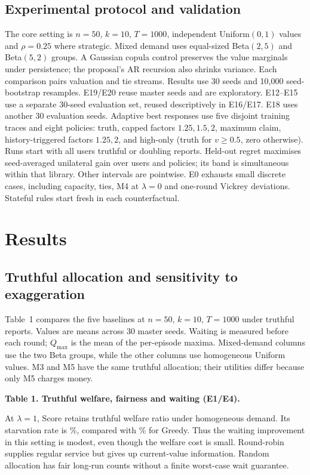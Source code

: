 \documentclass{article}
\newcommand{\resulttable}[1]{\begin{center}\small\setlength{\tabcolsep}{5pt}\end{center}}
\begin{document}
\subsection{Experimental protocol and validation}
The core setting is $n=50$, $k=10$, $T=1000$, independent Uniform$(0,1)$
values and $\rho=0.25$ where strategic. Mixed demand uses equal-sized
Beta$(2,5)$ and Beta$(5,2)$ groups. A Gaussian copula control preserves the
value marginals under persistence; the proposal's AR recursion also shrinks variance.
Each comparison pairs valuation and tie streams. Results use 30 seeds and
10,000 seed-bootstrap resamples. E19/E20 reuse master seeds and are exploratory.
E12--E15 use a separate 30-seed evaluation set, reused descriptively in E16/E17.
E18 uses another 30 evaluation seeds. Adaptive best responses use five disjoint
training traces and eight policies: truth, capped factors $1.25,1.5,2$,
maximum claim, history-triggered factors $1.25,2$, and high-only
(truth for $v\ge0.5$, zero otherwise). Runs start with all users truthful or
doubling reports.
Held-out regret maximises seed-averaged unilateral gain over users and policies;
its band is simultaneous within that library. Other intervals are pointwise.
E0 exhausts small discrete cases, including capacity, ties, M4 at $\lambda=0$
and one-round Vickrey deviations. Stateful rules start fresh in each counterfactual.



\newpage
\section{Results}
\subsection{Truthful allocation and sensitivity to exaggeration}
Table~1 compares the five baselines at $n=50$, $k=10$, $T=1000$ under
truthful reports. Values are means across 30 master seeds. Waiting is measured
before each round; $Q_{\max}$ is the mean of the per-episode maxima.
Mixed-demand columns use the two Beta groups, while the other columns use
homogeneous Uniform values. M3 and M5 have the same truthful allocation;
their utilities differ because only M5 charges money.

\begin{center}\small\textbf{Table 1. Truthful welfare, fairness and waiting (E1/E4).}\end{center}
\resulttable{truth}

At $\lambda=1$, Score retains truthful welfare ratio \TruthScoreWR{} under
homogeneous demand. Its starvation rate is \TruthScoreSR{}\%, compared
with \TruthGreedySR{}\% for Greedy. Thus the waiting improvement in this
setting is modest, even though the welfare cost is small. Round-robin supplies
regular service but gives up current-value information. Random allocation
has fair long-run counts without a finite worst-case wait guarantee.
\end{document}
